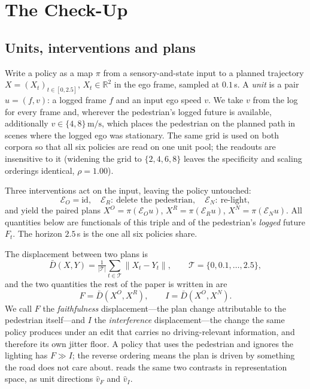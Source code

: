 \section{The Check-Up}
\label{sec:checkup}



\subsection{Units, interventions and plans}
Write a policy as a map $\pi$ from a sensory-and-state input to a planned trajectory
$X=(X_t)_{t\in[0,2.5]}$, $X_t\in\mathbb{R}^2$ in the ego frame, sampled at $0.1$\,s. A \emph{unit} is a
pair $u=(f,v)$: a logged frame $f$ and an input ego speed $v$. We take $v$ from the log for every
frame and, wherever the pedestrian's logged future is available, additionally
$v\in\{4,8\}\,\mathrm{m/s}$, which places the pedestrian on the planned path in scenes where the logged
ego was stationary. The same grid is used on both corpora so that all six policies are read on one
unit pool; the readouts are insensitive to it (widening the grid to $\{2,4,6,8\}$ leaves the
specificity and scaling orderings identical, $\rho=1.00$).

Three interventions act on the input, leaving the policy untouched:
\begin{equation}
\mathcal{E}_O=\mathrm{id},\quad
\mathcal{E}_R:\ \text{delete the pedestrian},\quad
\mathcal{E}_N:\ \text{re-light},
\label{eq:interventions}
\end{equation}
and yield the paired plans $X^{O}=\pi(\mathcal{E}_O u)$, $X^{R}=\pi(\mathcal{E}_R u)$,
$X^{N}=\pi(\mathcal{E}_N u)$. All quantities below are functionals of this triple and of the
pedestrian's \emph{logged} future $F_t$. The horizon $2.5$\,s is the one all six policies share.

The displacement between two plans is
\begin{equation}
\bar D(X,Y)=\tfrac{1}{|\mathcal{T}|}\textstyle\sum_{t\in\mathcal{T}}\|X_t-Y_t\|,\qquad
\mathcal{T}=\{0,0.1,\dots,2.5\},
\label{eq:disp}
\end{equation}
and the two quantities the rest of the paper is written in are
\begin{equation}
F=\bar D(X^{O},X^{R}),\qquad I=\bar D(X^{O},X^{N}).
\label{eq:FI}
\end{equation}
We call $F$ the \emph{faithfulness} displacement---the plan change attributable to the pedestrian
itself---and $I$ the \emph{interference} displacement---the change the same policy produces under an
edit that carries no driving-relevant information, and therefore its own jitter floor. A policy that
uses the pedestrian and ignores the lighting has $F\gg I$; the reverse ordering means the plan is
driven by something the road does not care about.  reads the same two contrasts in
representation space, as unit directions $\hat v_F$ and $\hat v_I$.

